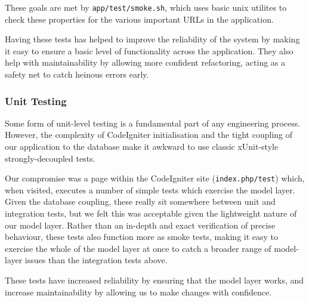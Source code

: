 These goals are met by \verb!app/test/smoke.sh!, which uses basic unix
utilites to check these properties for the various important URLs in
the application.

Having these tests has helped to improve the reliability of the system
by making it easy to ensure a basic level of functionality across the
application. They also help with maintainability by allowing more
confident refactoring, acting as a safety net to catch heinous errors
early.


\subsubsection{Unit Testing}

Some form of unit-level testing is a fundamental part of any
engineering process. However, the complexity of CodeIgniter
initialisation and the tight coupling of our application to the
database make it awkward to use classic xUnit-style strongly-decoupled
tests.

Our compromise was a page within the CodeIgniter site (\verb!index.php/test!) which, when
visited, executes a number of simple tests which exercise the model
layer. Given the database coupling, these really sit somewhere between
unit and integration tests, but we felt this was acceptable given the
lightweight nature of our model layer. Rather than an in-depth and
exact verification of precise behaviour, these tests also function
more as smoke tests, making it easy to exercise the whole of the model
layer at once to catch a broader range of model-layer issues than the
integration tests above.

These tests have increased reliability by ensuring that the model
layer works, and increase maintainability by allowing us to make
changes with confidence.
